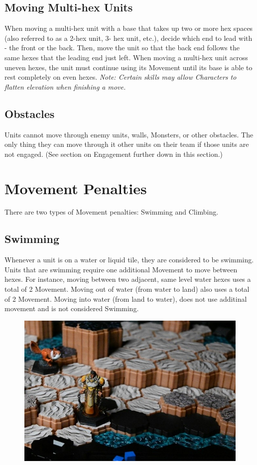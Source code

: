 \documentclass[../main.tex]{subfiles}
\begin{document}
\subsection{Moving Multi-hex Units}
When moving a multi-hex unit with a base that takes up two or more hex spaces (also referred to as a 2-hex unit, 3- hex unit, etc.), decide which end to lead with - the front or the back. Then, move the unit so that the back end follows the same hexes that the leading end just left. When moving a multi-hex unit across uneven hexes, the unit must continue using its Movement until its base is able to rest completely on even hexes.
\textit{Note: Certain skills may allow Characters to flatten elevation when finishing a move.}

\subsection{Obstacles}
Units cannot move through enemy units, walls, Monsters, or other obstacles. The only thing they can move through it other units on their team if those units are not engaged. (See section on Engagement further down in this section.)

\section{Movement Penalties}
There are two types of Movement penalties: Swimming and Climbing. 
\subsection{Swimming}
Whenever a unit is on a water or liquid tile, they are considered to be swimming. Units that are swimming require one additional Movement to move between hexes. For instance, moving between two adjacent, same level water hexes uses a total of 2 Movement. Moving out of water (from water to land) also uses a total of 2 Movement. Moving into water (from land to water), does not use additinal movement and is not considered Swimming. 

\begin{figure}[h]
    \centering
    \includegraphics[width=1\linewidth]{chapters//Movement/TimeStrikeWaterMovement1.jpg}
\end{figure}
\end{document}
